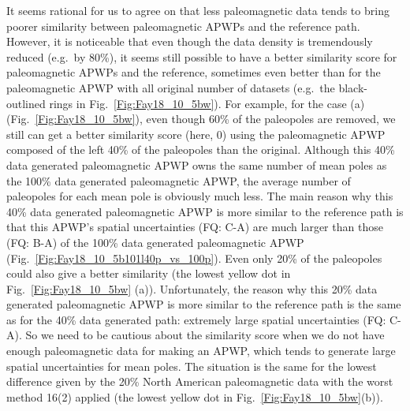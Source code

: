 It seems rational for us to agree on that less paleomagnetic data tends to bring
poorer similarity between paleomagnetic APWPs and the reference path. However,
it is noticeable that even though the data density is tremendously reduced
(e.g.\ by 80\%), it seems still possible to have a better similarity score for
paleomagnetic APWPs and the reference, sometimes even better than for the
paleomagnetic APWP with all original number of datasets (e.g.\ the
black-outlined rings in Fig.~\ref{Fig:Fay18_10_5bw}). For example, for the case
(a) (Fig.~\ref{Fig:Fay18_10_5bw}), even though 60\% of the paleopoles are
removed, we still can get a better similarity score (here, 0) using the
paleomagnetic APWP composed of the left 40\% of the paleopoles than the
original. Although this 40\% data generated paleomagnetic APWP owns the same
number of mean poles as the 100\% data generated paleomagnetic APWP, the average
number of paleopoles for each mean pole is obviously much less. The main reason
why this 40\% data generated paleomagnetic APWP is more similar to the reference
path is that this APWP's spatial uncertainties (FQ: C-A) are much larger than
those (FQ: B-A) of the 100\% data generated paleomagnetic APWP
(Fig.~\ref{Fig:Fay18_10_5b101l40p_vs_100p}). Even only 20\% of the paleopoles
could also give a better similarity (the lowest yellow dot in
Fig.~\ref{Fig:Fay18_10_5bw} (a)). Unfortunately, the reason why this 20\% data
generated paleomagnetic APWP is more similar to the reference path is the same
as for the 40\% data generated path: extremely large spatial uncertainties (FQ:
C-A). So we need to be cautious about the similarity score when we do not have
enough paleomagnetic data for making an APWP, which tends to generate large
spatial uncertainties for mean poles. The situation is the same for the lowest
difference given by the 20\% North American paleomagnetic data with the worst
method 16(2) applied (the lowest yellow dot in Fig.~\ref{Fig:Fay18_10_5bw}(b)).


